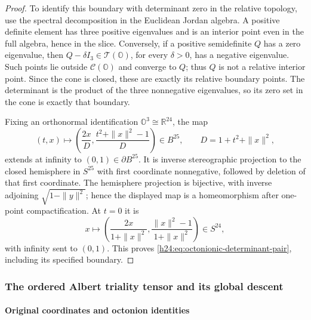 \begin{proof}
To identify this boundary with determinant zero in the relative topology,
use the spectral decomposition in the Euclidean Jordan algebra.
A positive definite element has three positive eigenvalues and is an
interior point even in the full algebra, hence in the slice.  Conversely,
if a positive semidefinite \(Q\) has a zero eigenvalue, then
\(Q-\delta I_3\in\mathcal T(\mathbb O)\), for every \(\delta>0\), has a
negative eigenvalue.  Such points lie outside \(\mathcal C(\mathbb O)\) and
converge to \(Q\); thus \(Q\) is not a relative interior point.
Since the cone is closed, these are exactly its relative boundary points.
The determinant is the product of the three nonnegative eigenvalues, so
its zero set in the cone is exactly that boundary.

Fixing an orthonormal identification \(\mathbb O^3\cong\mathbb R^{24}\), the map
\[
 (t,x)\longmapsto
 \left(\frac{2x}{D},\frac{t^2+\|x\|^2-1}{D}\right)\in B^{25},
 \qquad D=1+t^2+\|x\|^2,
\]
extends at infinity to \((0,1)\in\partial B^{25}\).
It is inverse stereographic projection to the closed hemisphere in
\(S^{25}\) with first coordinate nonnegative, followed by deletion of
that first coordinate.  The hemisphere projection is bijective, with
inverse adjoining \(\sqrt{1-\|y\|^2}\); hence the displayed map is a
homeomorphism after one-point compactification.  At \(t=0\) it is
\[
 x\longmapsto
 \left(\frac{2x}{1+\|x\|^2},
       \frac{\|x\|^2-1}{1+\|x\|^2}\right)\in S^{24},
\]
with infinity sent to \((0,1)\).  This proves
\eqref{h24:eq:octonionic-determinant-pair}, including its specified boundary.
\end{proof}

\subsubsection{The ordered Albert triality tensor and its global descent}
\label{h24:att:sec:ordered-tensor}

\paragraph{Original coordinates and octonion identities}

